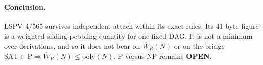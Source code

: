 \documentclass[11pt]{article}
\begin{document}
\paragraph{Conclusion.} LSPV-4/565 survives independent attack within its exact rules.  Its 41-byte figure is a weighted-sliding-pebbling quantity for one fixed DAG.  It is not a minimum over derivations, and so it does not bear on $\overline W_R(N)$ or on the bridge $\mathrm{SAT}\in\mathrm P\Rightarrow\overline W_R(N)\le\mathrm{poly}(N)$.  P versus NP remains \textbf{OPEN}.

\end{document}

